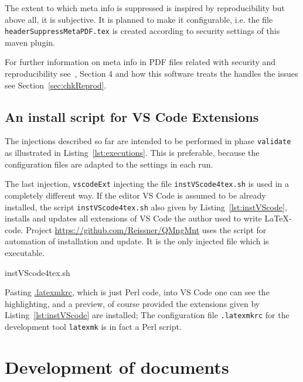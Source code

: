 The extent to which meta info is suppressed is inspired by reproducibility 
but above all, it is subjective. 
It is planned to make it configurable, 
i.e. the file \texttt{headerSuppressMetaPDF.tex} 
is created according to security settings of this maven plugin. 

For further information on meta info in PDF files 
related with security and reproducibility 
see~\cite{LatexGen}, Section 4 
and how this software treats the handles the issues 
see Section~\ref{sec:chkReprod}. 





\subsection{An install script for VS Code Extensions }\label{subsec:instExtVsCode}

The injections described so far are intended to be performed in phase \texttt{validate}  
as illustrated in Listing~\ref{lst:executions}. 
This is preferable, because the configuration files 
are adapted to the settings in each run. 

The last injection, \texttt{vscodeExt} injecting the file \texttt{instVScode4tex.sh} 
is used in a completely different way. 
If the editor VS Code is assumed to be already installed, 
the script \texttt{instVScode4tex.sh} 
also given by Listing~\ref{lst:instVScode}, 
installs and updates all extensions of VS Code the author used to write \LaTeX-code. 
Project \url{https://github.com/Reissner/QMngMnt} 
uses the script for automation of installation and update. 
It is the only injected file which is executable. 

%
{instVScode4tex.sh}

Pasting \href{\urlSite fromTex/.latexmkrc}{.latexmkrc}, 
which is just Perl code, 
into VS Code one can see the highlighting, and a preview, 
of course provided the extensions given by Listing~\ref{lst:instVScode} are installed; 
The configuration file \texttt{.latexmkrc} 
for the development tool \texttt{latexmk} is in fact a Perl script. 




\section{Development of documents}\label{sec:devel}

